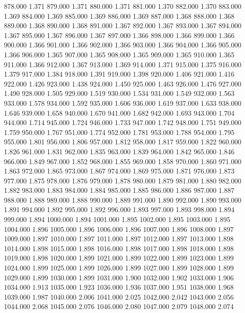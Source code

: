 878.000 1.371 
879.000 1.371 
880.000 1.371 
881.000 1.370 
882.000 1.370 
883.000 1.369 
884.000 1.369 
885.000 1.369 
886.000 1.369 
887.000 1.368 
888.000 1.368 
889.000 1.368 
890.000 1.368 
891.000 1.367 
892.000 1.367 
893.000 1.367 
894.000 1.367 
895.000 1.367 
896.000 1.367 
897.000 1.366 
898.000 1.366 
899.000 1.366 
900.000 1.366 
901.000 1.366 
902.000 1.366 
903.000 1.366 
904.000 1.366 
905.000 1.366 
906.000 1.365 
907.000 1.365 
908.000 1.365 
909.000 1.365 
910.000 1.365 
911.000 1.366 
912.000 1.367 
913.000 1.369 
914.000 1.371 
915.000 1.375 
916.000 1.379 
917.000 1.384 
918.000 1.391 
919.000 1.398 
920.000 1.406 
921.000 1.416 
922.000 1.426 
923.000 1.438 
924.000 1.450 
925.000 1.463 
926.000 1.476 
927.000 1.490 
928.000 1.505 
929.000 1.519 
930.000 1.534 
931.000 1.549 
932.000 1.563 
933.000 1.578 
934.000 1.592 
935.000 1.606 
936.000 1.619 
937.000 1.633 
938.000 1.646 
939.000 1.658 
940.000 1.670 
941.000 1.682 
942.000 1.693 
943.000 1.704 
944.000 1.714 
945.000 1.724 
946.000 1.733 
947.000 1.742 
948.000 1.751 
949.000 1.759 
950.000 1.767 
951.000 1.774 
952.000 1.781 
953.000 1.788 
954.000 1.795 
955.000 1.801 
956.000 1.806 
957.000 1.812 
958.000 1.817 
959.000 1.822 
960.000 1.826 
961.000 1.831 
962.000 1.835 
963.000 1.839 
964.000 1.842 
965.000 1.846 
966.000 1.849 
967.000 1.852 
968.000 1.855 
969.000 1.858 
970.000 1.860 
971.000 1.863 
972.000 1.865 
973.000 1.867 
974.000 1.869 
975.000 1.871 
976.000 1.873 
977.000 1.875 
978.000 1.876 
979.000 1.878 
980.000 1.879 
981.000 1.880 
982.000 1.882 
983.000 1.883 
984.000 1.884 
985.000 1.885 
986.000 1.886 
987.000 1.887 
988.000 1.888 
989.000 1.888 
990.000 1.889 
991.000 1.890 
992.000 1.890 
993.000 1.891 
994.000 1.892 
995.000 1.892 
996.000 1.893 
997.000 1.893 
998.000 1.894 
999.000 1.894 
1000.000 1.894 
1001.000 1.895 
1002.000 1.895 
1003.000 1.895 
1004.000 1.896 
1005.000 1.896 
1006.000 1.896 
1007.000 1.896 
1008.000 1.897 
1009.000 1.897 
1010.000 1.897 
1011.000 1.897 
1012.000 1.897 
1013.000 1.898 
1014.000 1.898 
1015.000 1.898 
1016.000 1.898 
1017.000 1.898 
1018.000 1.898 
1019.000 1.898 
1020.000 1.899 
1021.000 1.899 
1022.000 1.899 
1023.000 1.899 
1024.000 1.899 
1025.000 1.899 
1026.000 1.899 
1027.000 1.899 
1028.000 1.899 
1029.000 1.899 
1030.000 1.899 
1031.000 1.900 
1032.000 1.902 
1033.000 1.906 
1034.000 1.913 
1035.000 1.923 
1036.000 1.936 
1037.000 1.951 
1038.000 1.968 
1039.000 1.987 
1040.000 2.006 
1041.000 2.025 
1042.000 2.042 
1043.000 2.056 
1044.000 2.068 
1045.000 2.076 
1046.000 2.080 
1047.000 2.079 
1048.000 2.074 
